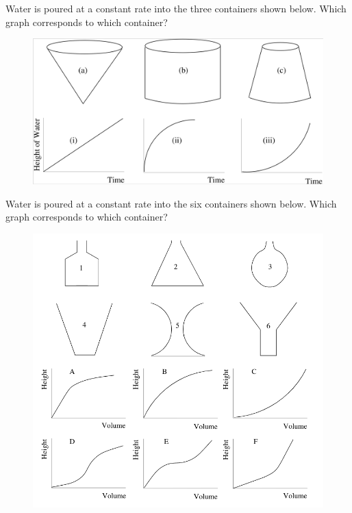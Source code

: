 \documentclass[nooutcomes]{ximera}
\begin{document}
\newpage


\begin{problem} \label{graphicDetails2}
Water is poured at a constant rate into the three containers shown
below. Which graph corresponds to which container?

\begin{figure}[h]
\begin{center}
\includegraphics[width=\textwidth]{elementaryActivities/graphics/GraphicDetails2.png}
\end{center}
\end{figure}


\end{problem}

\newpage

\begin{problem} \label{graphicDetails3}
Water is poured at a constant rate into the six containers shown
below. Which graph corresponds to which container?

\begin{figure}[h]
\begin{center}
\includegraphics[width=\textwidth]{elementaryActivities/graphics/GraphicDetails3.png}
\end{center}
\end{figure}


\end{problem}
\end{document}
